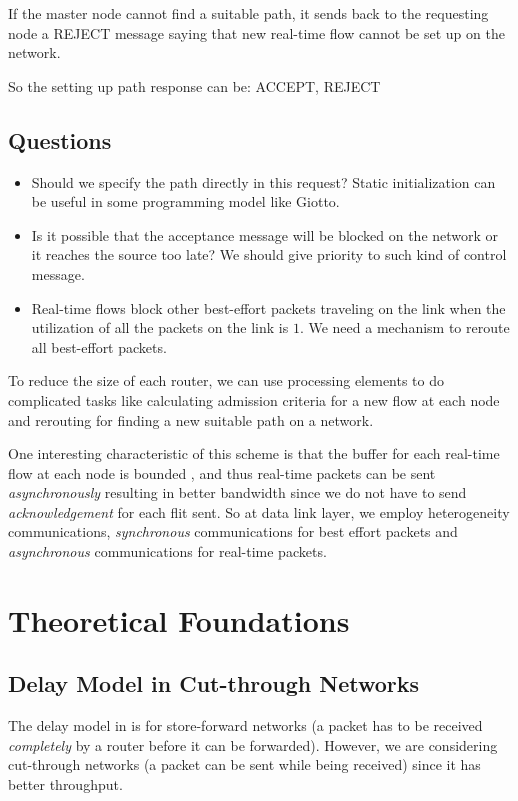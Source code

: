 \documentclass[a4]{article}
\begin{document}
If the master node cannot find a suitable path, it sends back to the requesting
node a REJECT message saying that new real-time flow cannot be set up on the
network.

So the setting up path response can be: ACCEPT, REJECT

\subsection{Questions}
\begin{itemize}
\item Should we specify the path directly in this request? Static initialization 
can be useful in some programming model like Giotto.	
\item Is it possible that the acceptance message will be blocked on the network 
or it reaches the source too late? We should give priority to such kind of control
message.
\item Real-time flows block other best-effort packets traveling on the link when 
the utilization of all the packets on the link is $1$. We need a mechanism to
reroute all best-effort packets.
\end{itemize}

To reduce the size of each router, we can use processing elements to do 
complicated tasks like calculating admission criteria for a new flow at each node 
and rerouting for finding a new suitable path on a network.


One interesting characteristic of this scheme is that the buffer for each 
real-time flow at each node is bounded \cite{Ferrari90ascheme}, and thus
real-time packets can be sent {\em asynchronously} resulting in better bandwidth
since we do not have to send {\em acknowledgement} for each flit sent. So at
data link layer, we employ heterogeneity communications, {\em synchronous}
communications for best effort packets and {\em asynchronous} communications
for real-time packets.

\section{Theoretical Foundations}
\subsection{Delay Model in Cut-through Networks}

The delay model in \cite{Ferrari90ascheme, VermaJitter91} is
for store-forward networks \cite{DallyPrinNetwork} (a packet has to be
received {\em completely} by a router before it can be forwarded). However, we
are considering cut-through networks (a packet can be sent while being
received) since it has better throughput.
\end{document}
